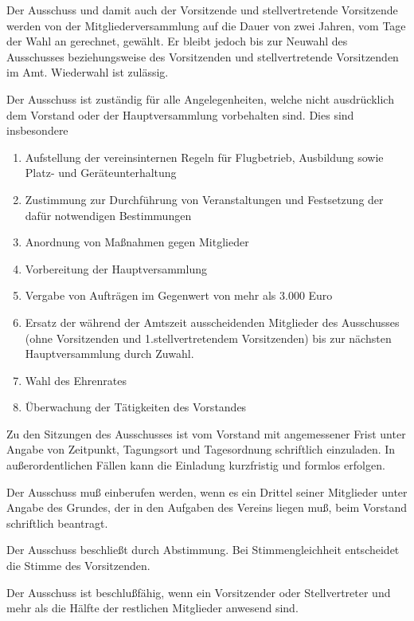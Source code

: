 \documentclass[10pt,a4paper,parskip=half]{scrartcl}
\begin{document}
\begin{contract}
    Der Ausschuss und damit auch der Vorsitzende und stellvertretende Vorsitzende werden von der Mitgliederversammlung auf die Dauer von zwei Jahren,
    vom Tage der Wahl an gerechnet, gewählt.
    Er bleibt jedoch bis zur Neuwahl des Ausschusses beziehungsweise des Vorsitzenden und stellvertretende Vorsitzenden im Amt.
    Wiederwahl ist zulässig.
    
    Der Ausschuss ist zuständig für alle Angelegenheiten,
    welche nicht ausdrücklich dem Vorstand oder der Hauptversammlung vorbehalten sind.
    Dies sind insbesondere
    \begin{enumerate}[label=\alph*),noitemsep]
      \item Aufstellung der vereinsinternen Regeln für Flugbetrieb,
            Ausbildung sowie Platz- und Geräteunterhaltung
      \item Zustimmung zur Durchführung von Veranstaltungen und Festsetzung der dafür notwendigen Bestimmungen
      \item Anordnung von Maßnahmen gegen Mitglieder
      \item Vorbereitung der Hauptversammlung
      \item Vergabe von Aufträgen im Gegenwert von mehr als 3.000 Euro
      \item Ersatz der während der Amtszeit ausscheidenden Mitglieder des Ausschusses (ohne Vorsitzenden und 1.stellvertretendem Vorsitzenden) bis zur nächsten Hauptversammlung durch Zuwahl.
      \item Wahl des Ehrenrates
      \item Überwachung der Tätigkeiten des Vorstandes
    \end{enumerate}
    
    Zu den Sitzungen des Ausschusses ist vom Vorstand mit angemessener Frist unter Angabe von Zeitpunkt,
    Tagungsort und Tagesordnung schriftlich einzuladen.
    In außerordentlichen Fällen kann die Einladung kurzfristig und formlos erfolgen.
    
    Der Ausschuss muß einberufen werden,
    wenn es ein Drittel seiner Mitglieder unter Angabe des Grundes,
    der in den Aufgaben des Vereins liegen muß,
    beim Vorstand schriftlich beantragt.
    
    Der Ausschuss beschließt durch Abstimmung.
    Bei Stimmengleichheit entscheidet die Stimme des Vorsitzenden.
    
    Der Ausschuss ist beschlußfähig,
    wenn ein Vorsitzender oder Stellvertreter und mehr als die Hälfte der restlichen Mitglieder anwesend sind.
    

\end{contract}
\end{document}

